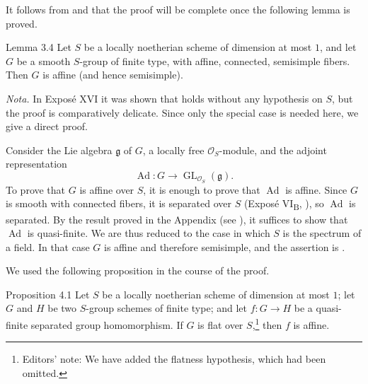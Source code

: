 It follows from  and  that the proof will be complete once the
following lemma is proved.

\begin{sgastatement}{Lemma 3.4}
Let \(S\) be a locally noetherian scheme of dimension at most \(1\),
and let \(G\) be a smooth \(S\)-group of finite type, with affine,
connected, semisimple fibers. Then \(G\) is affine (and hence
semisimple).
\end{sgastatement}

\noindent\textit{Nota.}\quad
In Exposé XVI it was shown that  holds without any hypothesis on
\(S\), but the proof is comparatively delicate. Since only the special
case  is needed here, we give a direct proof.

Consider the Lie algebra \(\mathfrak g\) of \(G\), a locally free
\(\mathcal O_S\)-module, and the adjoint representation
\[
 \operatorname{Ad}\colon
 G\longrightarrow\operatorname{GL}_{\mathcal O_S}(\mathfrak g).
\]
To prove that \(G\) is affine over \(S\), it is enough to prove that
\(\operatorname{Ad}\) is affine. Since \(G\) is smooth with connected
fibers, it is separated over \(S\) (Exposé VI\textsubscript{B}, ),
so \(\operatorname{Ad}\) is separated. By the result proved in the
Appendix (see ), it suffices to show that \(\operatorname{Ad}\) is
quasi-finite. We are thus reduced to the case in which \(S\) is the
spectrum of a field. In that case \(G\) is affine and therefore
semisimple, and the assertion is .



We used the following proposition in the course of the proof.

\begin{sgastatement}{Proposition 4.1}
Let \(S\) be a locally noetherian scheme of dimension at most \(1\);
let \(G\) and \(H\) be two \(S\)-group schemes of finite type; and let
\(f\colon G\to H\) be a quasi-finite separated group homomorphism.
If \(G\) is flat over \(S\),\footnote{Editors' note: We have added the
flatness hypothesis, which had been omitted.} then \(f\) is affine.
\end{sgastatement}


